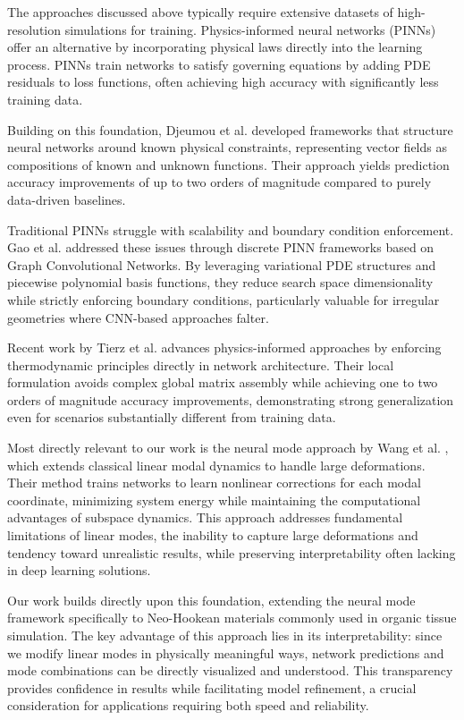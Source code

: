 The approaches discussed above typically require extensive datasets of high-resolution simulations for training. Physics-informed neural networks (PINNs) \cite{raissi2024physicsinformedneuralnetworksextensions} offer an alternative by incorporating physical laws directly into the learning process. PINNs train networks to satisfy governing equations by adding PDE residuals to loss functions, often achieving high accuracy with significantly less training data.

Building on this foundation, Djeumou et al. \cite{djeumouNeuralNetworksPhysicsInformed2022} developed frameworks that structure neural networks around known physical constraints, representing vector fields as compositions of known and unknown functions. Their approach yields prediction accuracy improvements of up to two orders of magnitude compared to purely data-driven baselines.

Traditional PINNs struggle with scalability and boundary condition enforcement. Gao et al. \cite{gaoPhysicsinformedGraphNeural2022} addressed these issues through discrete PINN frameworks based on Graph Convolutional Networks. By leveraging variational PDE structures and piecewise polynomial basis functions, they reduce search space dimensionality while strictly enforcing boundary conditions, particularly valuable for irregular geometries where CNN-based approaches falter.

Recent work by Tierz et al. \cite{Tierz_Alfaro_González_Chinesta_Cueto_2025} advances physics-informed approaches by enforcing thermodynamic principles directly in network architecture. Their local formulation avoids complex global matrix assembly while achieving one to two orders of magnitude accuracy improvements, demonstrating strong generalization even for scenarios substantially different from training data.

Most directly relevant to our work is the neural mode approach by Wang et al. \cite{Wang_Du_Coros_Thomaszewski_2024}, which extends classical linear modal dynamics \cite{Pentland_Williams_1989} to handle large deformations. Their method trains networks to learn nonlinear corrections for each modal coordinate, minimizing system energy while maintaining the computational advantages of subspace dynamics. This approach addresses fundamental limitations of linear modes, the inability to capture large deformations and tendency toward unrealistic results, while preserving interpretability often lacking in deep learning solutions.

Our work builds directly upon this foundation, extending the neural mode framework specifically to Neo-Hookean materials commonly used in organic tissue simulation. The key advantage of this approach lies in its interpretability: since we modify linear modes in physically meaningful ways, network predictions and mode combinations can be directly visualized and understood. This transparency provides confidence in results while facilitating model refinement, a crucial consideration for applications requiring both speed and reliability.
